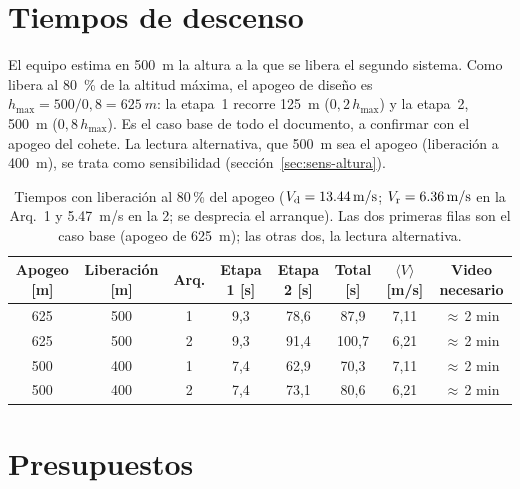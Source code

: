 \section{Tiempos de descenso}\label{sec:dim-tiempos}
El equipo estima en \SI{500}{m} la altura a la que se libera el segundo sistema. Como 
libera al \SI{80}{\percent} de la altitud máxima, el apogeo de diseño es
$h_{\max}=500/0{,}8=\SI{625}{m}$: la etapa~1 recorre \SI{125}{m} ($0{,}2\,h_{\max}$) y la
etapa~2, \SI{500}{m} ($0{,}8\,h_{\max}$). Es el caso base de todo el documento, a confirmar con el
apogeo del cohete. La lectura alternativa, que \SI{500}{m} sea el apogeo (liberación a
\SI{400}{m}), se trata como sensibilidad (sección~\ref{sec:sens-altura}).

\begin{table}[H]
\centering\small
\caption{Tiempos con liberación al 80\,\% del apogeo ($V_{\mathrm{d}}=\SI{13.44}{m/s}$; $V_{\mathrm{r}}=\SI{6.36}{m/s}$ en
la Arq.~1 y \SI{5.47}{m/s} en la 2; se desprecia el arranque). Las dos primeras filas son el caso base
(apogeo de \SI{625}{m}); las otras dos, la lectura alternativa.}\label{tab:tiempos}
\setlength{\tabcolsep}{3.5pt}
\begin{tabular}{@{}cccccccc@{}}
\toprule
\textbf{Apogeo} [m] & \textbf{Liberación} [m] & \textbf{Arq.} & \textbf{Etapa 1} [s] & \textbf{Etapa 2} [s] & \textbf{Total} [s] & $\langle V\rangle$ [m/s] & \textbf{Video necesario}\\\midrule
625 & 500 & 1 & 9,3 & 78,6 & 87,9  & 7,11 & $\approx$\,2 min\\
625 & 500 & 2 & 9,3 & 91,4 & 100,7 & 6,21 & $\approx$\,2 min\\\midrule
500 & 400 & 1 & 7,4 & 62,9 & 70,3  & 7,11 & $\approx$\,2 min\\
500 & 400 & 2 & 7,4 & 73,1 & 80,6  & 6,21 & $\approx$\,2 min\\
\bottomrule
\end{tabular}
\end{table}

\section{Presupuestos}\label{sec:masa}

